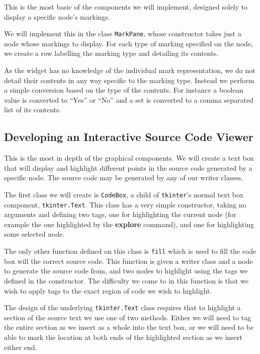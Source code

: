 \documentclass[twoside,a4paper]{report}
\begin{document}
This is the most basic of the components we will implement, designed solely to display a specific node's markings.

We will implement this in the class \texttt{MarkPane}, whose constructor takes just a node whose markings to display. For each type of marking specified on the
node, we create a row labelling the marking type and detailing its contents.

As the widget has no knowledge of the individual mark representation, we do not detail their contents in any way specific to the marking type. Instead we perform
a simple conversion based on the type of the contents. For instance a boolean value is converted to ``Yes'' or ``No'' and a set is converted to a comma separated
list of its contents.

\subsection{Developing an Interactive Source Code Viewer}

This is the most in depth of the graphical components. We will create a text box that will display and highlight different points in the source code generated
by a specific node. The source code may be generated by any of our writer classes.

The first class we will create is \texttt{CodeBox}, a child of \texttt{tkinter}'s normal text box component, \texttt{tkinter.Text}. This class has a very
simple constructor, taking no arguments and defining two tags, one for highlighting the current node (for example the one highlighted by the
\textbf{explore} command), and one for highlighting some selected node.

The only other function defined on this class is \texttt{fill} which is used to fill the code box will the correct source code. This function is given a
writer class and a node to generate the source code from, and two nodes to highlight using the tags we defined in the constructor. The difficulty we come to
in this function is that we wish to apply tags to the exact region of code we wish to highlight.

The design of the underlying \texttt{tkinter.Text} class requires that to highlight a section of the source text we use one of two methods. Either we will
need to tag the entire section as we insert as a whole into the text box, or we will need to be able to mark the location at both ends of the highlighted
section as we insert either end.
\end{document}
